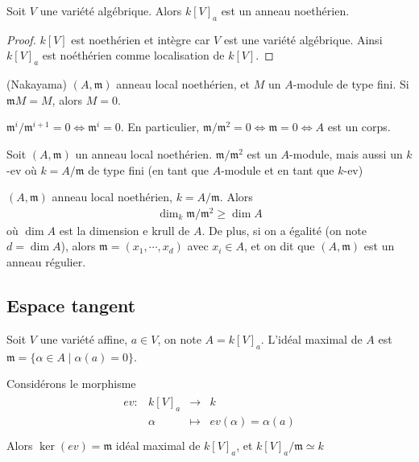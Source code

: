                 \begin{coro}
                    Soit $V$ une variété algébrique. Alors $k[V]_a$ est un anneau noethérien.
                \end{coro}
                \begin{proof}
                    $k[V]$ est noethérien et intègre car $V$ est une variété algébrique. Ainsi $k[V]_a$ est noéthérien comme localisation de $k[V]$.
                \end{proof}
                \begin{lemm} (Nakayama)
                    $(A, \mathfrak{m})$ anneau local noethérien, et $M$ un $A$-module de type fini. Si $\mathfrak{m} M = M$, alors $M = 0$.
                \end{lemm}
                \begin{coro}
                    $\mathfrak{m}^i/ \mathfrak{m}^{i+1} = 0 \iff \mathfrak{m}^i = 0$. En particulier, $\mathfrak{m}/\mathfrak{m}^2 = 0 \iff \mathfrak{m} = 0 \iff A$ est un corps.
                \end{coro}
                \begin{remq}
                    Soit $(A, \mathfrak{m})$ un anneau local noethérien. $\mathfrak{m}/\mathfrak{m}^2$ est un $A$-module, mais aussi un $k$-ev où $k = A/\mathfrak{m}$ de type fini (en tant que $A$-module et en tant que $k$-ev)
                \end{remq}
                \begin{theo}
                    $(A, \mathfrak{m})$ anneau local noethérien, $k = A/\mathfrak{m}$. Alors
                    \begin{align*}
                        \dim_k \mathfrak{m}/\mathfrak{m}^2 \geq \dim A
                    \end{align*}
                    où $\dim A$ est la dimension e krull de $A$. De plus, si on a égalité (on note $d = \dim A$), alors $\mathfrak{m} = (x_1, \cdots ,x_d)$ avec $x_i \in A$, et on dit que $(A, \mathfrak{m})$ est un anneau régulier.
                \end{theo}
            
        \subsection{Espace tangent}
            Soit $V$ une variété affine, $a \in V$, on note $A = k[V]_a$. L'idéal maximal de $A$ est $\mathfrak{m} = \{\alpha \in A \mid \alpha(a) = 0\}$.
            \begin{exo}
                Considérons le morphisme
                \begin{align*}
                    \begin{array}{cccc}
                        ev : & k[V]_a & \to & k \\
                        & \alpha & \mapsto & ev(\alpha) = \alpha(a) \\
                    \end{array}
                \end{align*}
                Alors $\ker(ev) = \mathfrak{m}$ idéal maximal de $k[V]_a$, et $k[V]_a/\mathfrak{m} \simeq k$
            \end{exo}
            
